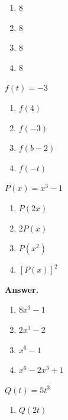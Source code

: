 \documentclass[10pt,]{book}
\theoremstyle{plain}
\theoremstyle{definition}
\theoremstyle{definition}
\theoremstyle{definition}
\begin{document}
\begin{exerciselist}
\begin{exercisegroup}
\begin{multicols}{2}
\begin{enumerate}[label=\alph*]
\item\hypertarget{li-260}{}\(8\)%
\item\hypertarget{li-261}{}\(8\)%
\item\hypertarget{li-262}{}\(8\)%
\item\hypertarget{li-263}{}\(8 \)%
\end{enumerate}
\end{multicols}
%
\exercise[62.]\hypertarget{exercise-72}{}\(f (t) = -3\) \leavevmode%
\begin{multicols}{2}
\begin{enumerate}[label=\alph*]
\item\hypertarget{li-264}{}\(f (4)\)%
\item\hypertarget{li-265}{}\(f (-3)\)%
\item\hypertarget{li-266}{}\(f (b - 2)\)%
\item\hypertarget{li-267}{}\(f (-t)\)%
\end{enumerate}
\end{multicols}
%
\exercise[63.]\hypertarget{exercise-73}{}\(P(x) = x^3 - 1\) \leavevmode%
\begin{multicols}{2}
\begin{enumerate}[label=\alph*]
\item\hypertarget{li-268}{}\(P(2x)\)%
\item\hypertarget{li-269}{}\(2P(x)\)%
\item\hypertarget{li-270}{}\(P(x^2)\)%
\item\hypertarget{li-271}{}\([P(x)]^2\)%
\end{enumerate}
\end{multicols}
%
\par\smallskip
\noindent\textbf{Answer.}\hypertarget{answer-42}{}\quad
\leavevmode%
\begin{multicols}{2}
\begin{enumerate}[label=\alph*]
\item\hypertarget{li-272}{}\(8x^3 - 1\)%
\item\hypertarget{li-273}{}\(2x^3 - 2\)%
\item\hypertarget{li-274}{}\(x^6 - 1\)%
\item\hypertarget{li-275}{}\(x^6 - 2x^3 + 1 \)%
\end{enumerate}
\end{multicols}
%
\exercise[64.]\hypertarget{exercise-74}{}\(Q(t) = 5t^3\) \leavevmode%
\begin{multicols}{2}
\begin{enumerate}[label=\alph*]
\item\hypertarget{li-276}{}\(Q(2t)\)%

\end{enumerate}
\end{multicols}
\end{exercisegroup}
\end{exerciselist}
\end{document}
